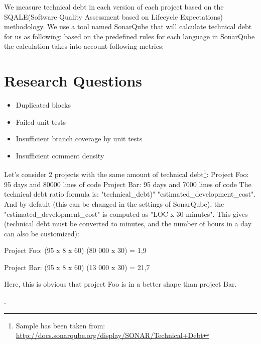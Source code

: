 We measure technical debt in each version of each project based on the SQALE(Software Quality Assessment based on Lifecycle Expectations) methodology. We use a tool named SonarQube that will calculate technical debt for us as following: based on the predefined rules for each language in SonarQube the calculation takes into account following metrics:

	\section{Research Questions}
	\begin{itemize}
		\item Duplicated blocks
		\item  Failed unit tests
		\item Insufficient branch coverage by unit tests
		\item Insufficient comment density
	\end{itemize}

Let's consider 2 projects with the same amount of technical debt\footnote{Sample has been taken from:\url{ http://docs.sonarqube.org/display/SONAR/Technical+Debt}}:
Project Foo: 95 days and 80000 lines of code
Project Bar: 95 days and 7000 lines of code
The technical debt ratio formula is: "technical\_debt)" \/ "estimated\_development\_cost". And by default (this can be changed in the settings of SonarQube), the "estimated\_development\_cost" is computed as "LOC x 30 minutes". This gives (technical debt must be converted to minutes, and the number of hours in a day can also be customized):
\par
Project Foo: (95 x 8 x 60) \/ (80 000 x 30) = 1,9%
\par
Project Bar: (95 x 8 x 60) \/ (13 000 x 30) = 21,7%
\par
Here, this is obvious that project Foo is in a better shape than project Bar.

\rqiii.





	
	

